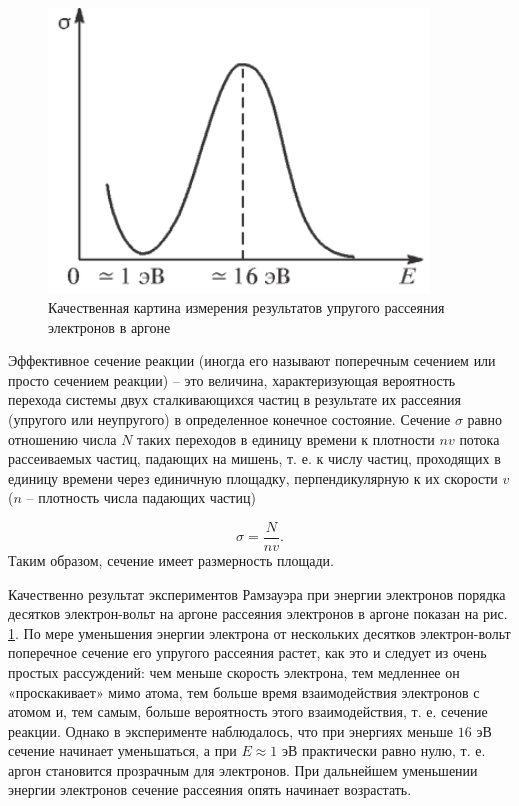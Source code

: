 \documentclass[a4paper,12pt]{article}
\begin{document}
\begin{figure}\label{fig: Scattering in Ramsauer–Townsend experiment}
    \begin{center}
    \vspace{-20pt}
        \includegraphics[width = 0.9\textwidth]{Scattering in Ramsauer–Townsend experiment.png}
    \end{center}
    \caption{Качественная картина измерения результатов упругого рассеяния электронов в аргоне}
\end{figure}
Эффективное сечение реакции (иногда его называют поперечным сечением или просто сечением реакции) -- это величина, характеризующая вероятность перехода системы двух сталкивающихся частиц в результате их рассеяния (упругого или неупругого) в определенное конечное состояние. Сечение $\sigma$ равно отношению числа $N$ таких переходов в единицу времени к плотности $nv$ потока рассеиваемых частиц, падающих на мишень, т. е. к числу частиц, проходящих в единицу времени через единичную площадку, перпендикулярную к их скорости $v$ ($n$ -- плотность числа падающих частиц)

\begin{equation}\label{eq: sigma}
    \sigma = \frac{N}{nv}.
\end{equation}
Таким образом, сечение имеет размерность площади.

Качественно результат экспериментов Рамзауэра при энергии электронов порядка десятков электрон-вольт на аргоне рассеяния электронов в аргоне
показан на рис. \hyperref[fig: Scattering in Ramsauer–Townsend experiment]{1}. По мере уменьшения энергии электрона от нескольких десятков электрон-вольт поперечное сечение его упругого рассеяния растет, как это и следует из очень простых рассуждений: чем меньше скорость электрона, тем медленнее он «проскакивает» мимо атома, тем больше время взаимодействия электронов с атомом и, тем самым, больше вероятность этого взаимодействия, т. е. сечение реакции. Однако в эксперименте наблюдалось, что при энергиях меньше $16$ эВ сечение начинает уменьшаться, а при $E \approx 1$ эВ практически равно нулю, т. е. аргон становится прозрачным для электронов. При дальнейшем уменьшении энергии электронов сечение рассеяния опять начинает возрастать.
\end{document}
